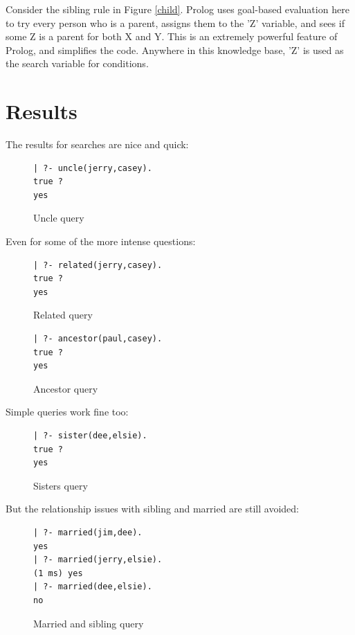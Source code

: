 \documentclass[12pt]{article}
\begin{document}
Consider the sibling rule in Figure \ref{child}. Prolog uses goal-based evaluation here to try every person who 
is a parent, assigns them to the 'Z' variable, and sees if some Z is a parent for both X and Y. This is an 
extremely powerful feature of Prolog, and simplifies the code. Anywhere in this knowledge base, 'Z' is used as
the search variable for conditions.



\section{Results}
The results for searches are nice and quick:
\begin{figure}[!h]
 \begin{lstlisting}
| ?- uncle(jerry,casey).  
true ? 
yes
 \end{lstlisting}
\caption{Uncle query}
\label{q1}
\end{figure}

Even for some of the more intense questions:
\begin{figure}[!h]
 \begin{lstlisting}
| ?- related(jerry,casey).
true ? 
yes
 \end{lstlisting}
\caption{Related query}
\label{q2}
\end{figure}

\pagebreak

\begin{figure}[!h]
 \begin{lstlisting}
| ?- ancestor(paul,casey).
true ? 
yes
 \end{lstlisting}
\caption{Ancestor query}
\label{q3}
\end{figure}

Simple queries work fine too:
\begin{figure}[!h]
 \begin{lstlisting}
| ?- sister(dee,elsie). 
true ? 
yes
 \end{lstlisting}
\caption{Sisters query}
\label{q4}
\end{figure}

But the relationship issues with sibling and married are still avoided:
\begin{figure}[!h]
 \begin{lstlisting}
| ?- married(jim,dee). 
yes
| ?- married(jerry,elsie).
(1 ms) yes
| ?- married(dee,elsie).  
no
 \end{lstlisting}
\caption{Married and sibling query}
\label{q5}
\end{figure}
\end{document}
